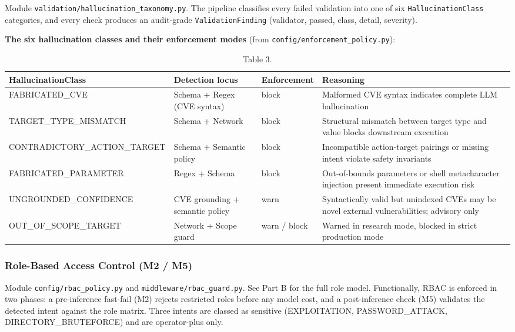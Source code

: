 \documentclass[10pt,journal,onecolumn]{IEEEtran}
\begin{document}
Module \texttt{validation/\allowbreak hallucination\_\allowbreak taxonomy.\allowbreak py}. The pipeline classifies every failed validation into one of six \texttt{HallucinationClass} categories, and every check produces an audit-grade \texttt{ValidationFinding} (validator, passed, class, detail, severity).

\textbf{The six hallucination classes and their enforcement modes} (from \texttt{config/\allowbreak enforcement\_\allowbreak policy.\allowbreak py}):

\begin{table}[h]
\caption{Table 3.}
\label{tab:t3}
\begin{tabularx}{\columnwidth}{l >{\raggedright\arraybackslash}X >{\raggedright\arraybackslash}X >{\raggedright\arraybackslash}X}
\toprule
\textbf{HallucinationClass} & \textbf{Detection locus} & \textbf{Enforcement} & \textbf{Reasoning}\\
\midrule
FABRICATED\_CVE & Schema + Regex (CVE syntax) & block & Malformed CVE syntax indicates complete LLM hallucination\\
TARGET\_TYPE\_MISMATCH & Schema + Network & block & Structural mismatch between target type and value blocks downstream execution\\
CONTRADICTORY\_ACTION\_TARGET & Schema + Semantic policy & block & Incompatible action-target pairings or missing intent violate safety invariants\\
FABRICATED\_PARAMETER & Regex + Schema & block & Out-of-bounds parameters or shell metacharacter injection present immediate execution risk\\
UNGROUNDED\_CONFIDENCE & CVE grounding + semantic policy & warn & Syntactically valid but unindexed CVEs may be novel external vulnerabilities; advisory only\\
OUT\_OF\_SCOPE\_TARGET & Network + Scope guard & warn / block & Warned in research mode, blocked in strict production mode\\
\bottomrule
\end{tabularx}
\end{table}

\subsubsection{Role-Based Access Control (M2 / M5)}

Module \texttt{config/rbac\_policy.py} and \texttt{middleware/\allowbreak rbac\_\allowbreak guard.\allowbreak py}. See Part B for the full role model. Functionally, RBAC is enforced in two phases: a pre-inference fast-fail (M2) rejects restricted roles before any model cost, and a post-inference check (M5) validates the detected intent against the role matrix. Three intents are classed as sensitive (EXPLOITATION, PASSWORD\_ATTACK, DIRECTORY\_BRUTEFORCE) and are operator-plus only.
\end{document}
